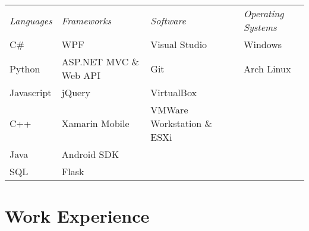 \documentclass[a4paper,10pt]{article} %
\begin{document}
\begin{tabular}{l|l|l|l}
\textit{Languages} & \textit{Frameworks} & \textit{Software} & \textit{Operating Systems} \\
C\# & WPF & Visual Studio & Windows \\
Python & ASP.NET MVC \& Web API & Git & Arch Linux \\
Javascript & jQuery & VirtualBox & \\
C++ & Xamarin Mobile & VMWare Workstation \& ESXi & \\
Java & Android SDK & & \\
SQL & Flask & & \\
\end{tabular}

\section{Work Experience}
\end{document}
